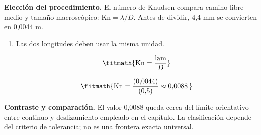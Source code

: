 \noindent\textbf{Elección del procedimiento.} El número de Knudsen compara camino libre medio y tamaño macroscópico: $\mathrm{Kn}=\lambda/D$. Antes de dividir, 4,4 mm se convierten en 0,0044 m.

\begin{enumerate}

\item Las dos longitudes deben usar la misma unidad.

\[\fitmath{\mathrm{Kn}=\frac{\mathrm{lam}}{D}}\]

\[\fitmath{\mathrm{Kn}=\frac{(0{,}0044)}{(0{,}5)}\approx 0{,}0088\,}\]

\end{enumerate}

\noindent\textbf{Contraste y comparación.} El valor 0,0088 queda cerca del límite orientativo entre continuo y deslizamiento empleado en el capítulo. La clasificación depende del criterio de tolerancia; no es una frontera exacta universal.
